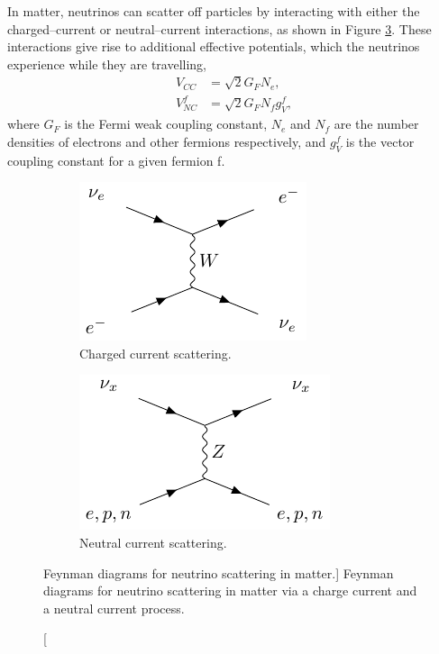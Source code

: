 In matter, neutrinos can scatter off particles by interacting with either
the charged--current or neutral--current interactions, as shown in Figure
\ref{fig:nu_in_matter}. These interactions give rise to additional effective
potentials, which the neutrinos experience while they are travelling,
\begin{align*}
	V_{CC} &= \sqrt{2} G_F N_e, \\
	V_{NC}^f &= \sqrt{2} G_F N_f g_V^f,
\end{align*}
where $G_F$ is the Fermi weak coupling constant, $N_e$ and $N_f$ are the number
densities of electrons and other fermions respectively, and $g_V^f$ is the
vector coupling constant for a given fermion f.
\begin{figure}
	\centering

	\begin{subfigure}[b]{0.49\textwidth}
		\includegraphics[width=\textwidth]{latex_extras/ne_cc.pdf}
		\caption{Charged current scattering.}
		\label{fig:nu_cc}
	\end{subfigure}
	\hfill
	\begin{subfigure}[b]{0.49\textwidth}
		\includegraphics[width=\textwidth]{latex_extras/n_nc.pdf}
		\caption{Neutral current scattering.}
		\label{fig:nu_nc}
	\end{subfigure}

	\caption
	[Feynman diagrams for neutrino scattering in matter.]
	{Feynman diagrams for neutrino scattering in matter via a charge current and a
	neutral current process.}

	\label{fig:nu_in_matter}
\end{figure}

